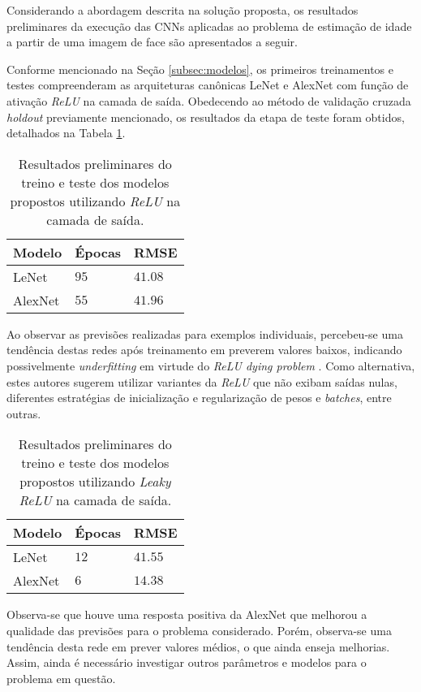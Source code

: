 
Considerando a abordagem descrita na solução proposta, os resultados preliminares da execução das CNNs aplicadas ao problema de estimação de idade a partir de uma imagem de face são apresentados a seguir.

Conforme mencionado na Seção \ref{subsec:modelos}, os primeiros treinamentos e testes compreenderam as arquiteturas canônicas LeNet e AlexNet com função de ativação \emph{ReLU} na camada de saída. Obedecendo ao método de validação cruzada \emph{holdout} previamente mencionado, os resultados da etapa de teste foram obtidos, detalhados na Tabela \ref{tab:results_relu}.


\begin{table}[h!]
     \caption{Resultados preliminares do treino e teste dos modelos propostos utilizando \emph{ReLU} na camada de saída.}
     \label{tab:results_relu}
     \centering
     \begin{tabular}{l l l}
          \toprule
          Modelo & Épocas &RMSE \\
          \midrule
          LeNet & $95$ & $41.08$ \\
          AlexNet & $55$ & $41.96$\\
          \bottomrule
     \end{tabular}
\end{table}

Ao observar as previsões realizadas para exemplos individuais, percebeu-se uma tendência destas redes após treinamento em preverem valores baixos, indicando possivelmente \emph{underfitting} em virtude do \emph{ReLU dying problem} \cite{djork2015elus, dabal2018elus}. Como alternativa, estes autores sugerem  utilizar variantes da \emph{ReLU} que não exibam saídas nulas, diferentes estratégias de inicialização e regularização de pesos e \emph{batches}, entre outras.

\begin{table}[h!]
     \caption{Resultados preliminares do treino e teste dos modelos propostos utilizando \emph{Leaky ReLU} na camada de saída.}
     \label{tab:results_leaky}
     \centering
     \begin{tabular}{l l l}
          \toprule
          Modelo & Épocas & RMSE \\
          \midrule
          LeNet & $12$ & $41.55$ \\
          AlexNet & $6$ & $14.38$\\
          \bottomrule
     \end{tabular}
\end{table}

Observa-se que houve uma resposta positiva da AlexNet que melhorou a qualidade das previsões para o problema considerado. Porém, observa-se uma tendência desta rede em prever valores médios, o que ainda enseja melhorias. Assim, ainda é necessário investigar outros parâmetros e modelos para o problema em questão.
